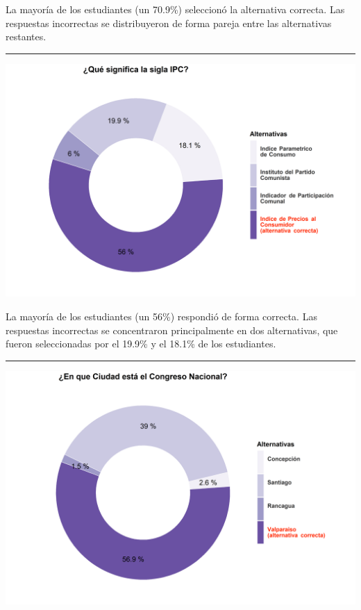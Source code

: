 \documentclass[
  14pt,
]{book}
\let\origfigure\figure
\let\endorigfigure\endfigure
\renewenvironment{figure}[1][2] {
  \expandafter\origfigure\expandafter[H]
} {
  \endorigfigure
}
\begin{document}
La mayoría de los estudiantes (un 70.9\%) seleccionó la alternativa correcta. Las respuestas incorrectas se distribuyeron de forma pareja entre las alternativas restantes.

\begin{center}\rule{0.5\linewidth}{0.5pt}\end{center}

\begin{figure}[!ht]

{\centering \includegraphics[width=0.8\linewidth,]{images/ccivico_13} 

}

\caption{Significado IPC}\label{fig:unnamed-chunk-17}
\end{figure}

La mayoría de los estudiantes (un 56\%) respondió de forma correcta. Las respuestas incorrectas se concentraron principalmente en dos alternativas, que fueron seleccionadas por el 19.9\% y el 18.1\% de los estudiantes.

\begin{center}\rule{0.5\linewidth}{0.5pt}\end{center}

\begin{figure}[!ht]

{\centering \includegraphics[width=0.8\linewidth,]{images/ccivico_14} 

}

\caption{Localización del Congreso}\label{fig:unnamed-chunk-18}
\end{figure}
\end{document}
